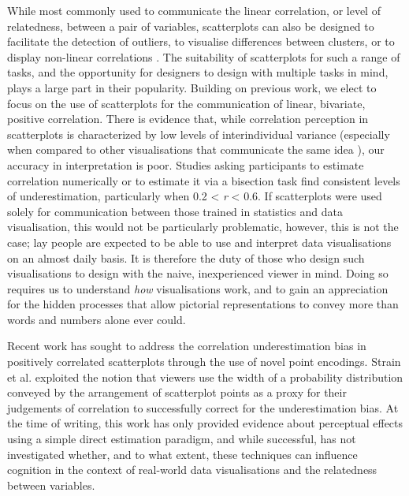 \documentclass[sigconf]{acmart}
\begin{document}
While most commonly used to communicate the linear correlation, or level
of relatedness, between a pair of variables, scatterplots can also be
designed to facilitate the detection of outliers, to visualise
differences between clusters, or to display non-linear correlations
\citep{sarikaya_2018}. The suitability of scatterplots for such a range
of tasks, and the opportunity for designers to design with multiple
tasks in mind, plays a large part in their popularity. Building on
previous work, we elect to focus on the use of scatterplots for the
communication of linear, bivariate, positive correlation. There is
evidence that, while correlation perception in scatterplots is
characterized by low levels of interindividual variance (especially when
compared to other visualisations that communicate the same idea
\citep{harrison_2014, kay_2015}), our accuracy in interpretation is
poor. Studies asking participants to estimate correlation numerically
\citep{strahan_1978, bobko_1979, cleveland_1982, lane_1985, lauer_1989, collyer_1990, meyer_1992}
or to estimate it via a bisection task \citep{rensink_2017} find
consistent levels of underestimation, particularly when 0.2 \textless{}
\emph{r} \textless{} 0.6. If scatterplots were used solely for
communication between those trained in statistics and data
visualisation, this would not be particularly problematic, however, this
is not the case; lay people are expected to be able to use and interpret
data visualisations on an almost daily basis. It is therefore the duty
of those who design such visualisations to design with the naive,
inexperienced viewer in mind. Doing so requires us to understand
\emph{how} visualisations work, and to gain an appreciation for the
hidden processes that allow pictorial representations to convey more
than words and numbers alone ever could.

Recent work has sought to address the correlation underestimation bias
in positively correlated scatterplots through the use of novel point
encodings. Strain et al. \citep{strain_2023, strain_2023b, strain_2024}
exploited the notion that viewers use the width of a probability
distribution conveyed by the arrangement of scatterplot points as a
proxy for their judgements of correlation to successfully correct for
the underestimation bias. At the time of writing, this work has only
provided evidence about perceptual effects using a simple direct
estimation paradigm, and while successful, has not investigated whether,
and to what extent, these techniques can influence cognition in the
context of real-world data visualisations and the relatedness between
variables.
\end{document}
